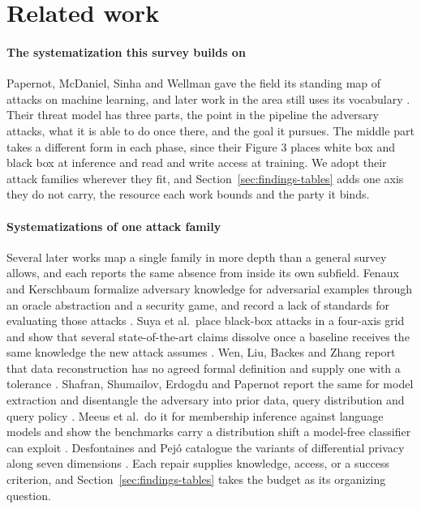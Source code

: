 \section{Related work}
\label{sec:related}

\paragraph{The systematization this survey builds on}
Papernot, McDaniel, Sinha and Wellman gave the field its standing map of attacks
on machine learning, and later work in the area still uses its vocabulary
\cite{PMSW18}. Their threat model has three parts, the point in the pipeline the
adversary attacks, what it is able to do once there, and the goal it pursues.
The middle part takes a different form in each phase, since their Figure 3
places white box and black box at inference and read and write access at
training. We adopt their attack families wherever they fit, and
Section~\ref{sec:findings-tables} adds one axis they do not carry, the resource
each work bounds and the party it binds.

\paragraph{Systematizations of one attack family}
Several later works map a single family in more depth than a general survey
allows, and each reports the same absence from inside its own subfield. Fenaux
and Kerschbaum formalize adversary knowledge for adversarial examples through an
oracle abstraction and a security game, and record a lack of standards for
evaluating those attacks \cite{FK24}. Suya et al.\ place \BBattacks{} black-box attacks
in a four-axis grid and show that several state-of-the-art claims dissolve once
a baseline receives the same knowledge the new attack assumes \cite{SSZHTE24}.
Wen, Liu, Backes and Zhang report that data reconstruction has no agreed formal
definition and supply one with a tolerance \cite{WLBZ25}. Shafran, Shumailov,
Erdogdu and Papernot report the same for model extraction and disentangle the
adversary into prior data, query distribution and query policy \cite{SSEP24}.
Meeus et al.\ do it for membership inference against language models and show
the benchmarks carry a distribution shift a model-free classifier can exploit
\cite{MSJFRM25}. Desfontaines and Pej\'o catalogue the variants of differential
privacy along seven dimensions \cite{DP20}. Each repair supplies knowledge,
access, or a success criterion, and Section~\ref{sec:findings-tables} takes the
budget as its organizing question.

